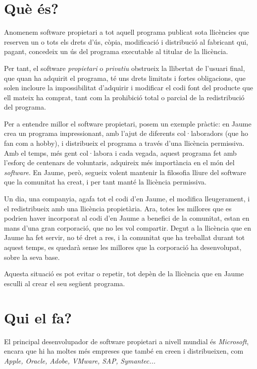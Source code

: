 \section{Què és?}

	Anomenem software propietari a tot aquell programa publicat sota llicències
	que reserven un o tots els drets d'ús, còpia, modificació i distribució
	al fabricant qui, pagant, concedeix un ús del programa executable al titular
	de la llicència.

	Per tant, el software \emph{propietari} o \emph{privatiu} obstrueix la llibertat
	de l'usuari final, que quan ha adquirit el programa, té uns drets limitats i fortes
	obligacions, que solen incloure la impossibilitat d'adquirir i modificar el codi font del producte
	que ell mateix ha comprat, tant com la prohibició total o parcial de la redistribució del programa.
	\cite{gnucategories}

	Per a entendre millor el software propietari, posem un exemple pràctic:	en Jaume crea un programa impressionant, amb l'ajut de diferents col·laboradors (que ho fan com a hobby),
	i distribueix el programa a través d'una llicència permissiva. Amb el temps, més gent col·labora i cada vegada,
	aquest programa fet amb l'esforç de centenars de voluntaris, adquireix més importància en el món del \emph{software}.
	En Jaume, però, segueix volent mantenir la filosofia lliure del software que la comunitat ha creat, i per tant
	manté la llicència permissiva.
	
	Un dia, una companyia, agafa tot el codi d'en Jaume, el modifica lleugerament, i
	el redistribueix amb una llicència propietària. Ara, totes les millores que es podrien haver incorporat
	al codi d'en Jaume a benefici de la comunitat, estan en mans d'una gran corporació, que no les vol compartir.
	Degut a la llicència que en Jaume ha fet servir, no té dret a res, i la comunitat que ha treballat durant tot aquest temps,
	es quedarà sense les millores que la corporació ha desenvolupat, sobre la seva base.
	
	Aquesta situació es pot evitar o repetir, tot depèn de la llicència que en Jaume esculli al crear el seu següent programa.

\section{Qui el fa?}

	El principal desenvolupador de software propietari a nivell mundial és \emph{Microsoft}, encara que hi
	ha moltes més empreses que també en creen i distribueixen, com \emph{Apple, Oracle, Adobe, VMware,
	SAP, Symantec...} \cite{propietariempreses}

